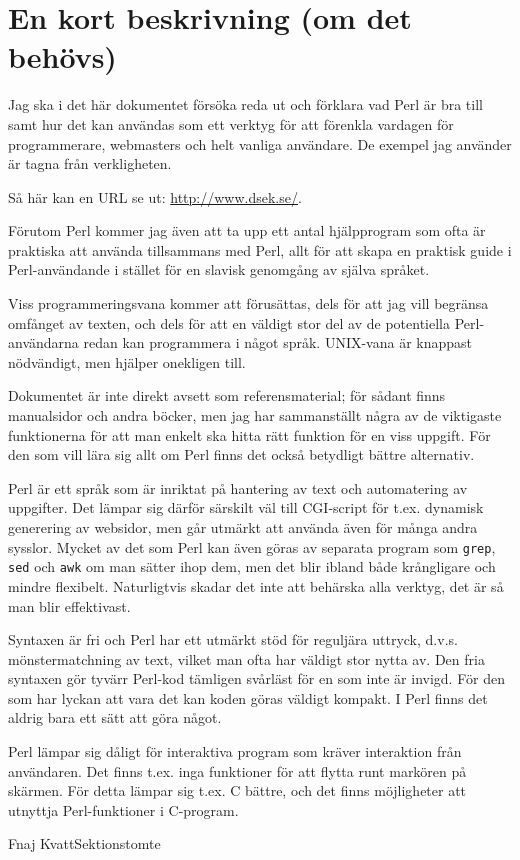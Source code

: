 \documentclass[11pt,twoside,a4paper]{article}
\begin{document}



\section*{En kort beskrivning (om det behövs)}

Jag ska i det här dokumentet försöka reda ut och förklara vad
Perl är bra till samt hur det kan användas som ett verktyg för
att förenkla vardagen för programmerare, webmasters och helt
vanliga användare. De exempel jag använder är tagna från
verkligheten.

Så här kan en URL se ut: \url{http://www.dsek.se/}.

Förutom Perl kommer jag även att ta upp ett antal hjälpprogram
som ofta är praktiska att använda tillsammans med Perl, allt för
att skapa en praktisk guide i Perl-användande i stället för en
slavisk genomgång av själva språket.

Viss programmeringsvana kommer att förusättas, dels för att jag
vill begränsa omfånget av texten, och dels för att en väldigt
stor del av de potentiella Perl-användarna redan kan programmera
i något språk. UNIX-vana är knappast nödvändigt, men hjälper
onekligen till.

Dokumentet är inte direkt avsett som referensmaterial; för sådant
finns manualsidor och andra böcker, men jag har sammanställt
några av de viktigaste funktionerna för att man enkelt ska hitta
rätt funktion för en viss uppgift. För den som vill lära sig allt
om Perl finns det också betydligt bättre alternativ.

Perl är ett språk som är inriktat på hantering av text och
automatering av uppgifter. Det lämpar sig därför särskilt väl
till CGI-script för t.ex. dynamisk generering av websidor, men
går utmärkt att använda även för många andra sysslor. Mycket av
det som Perl kan även göras av separata program som
\texttt{grep}, \texttt{sed} och \texttt{awk} om man sätter ihop
dem, men det blir ibland både krångligare och mindre flexibelt.
Naturligtvis skadar det inte att behärska alla verktyg, det är så
man blir effektivast.

Syntaxen är fri och Perl har ett utmärkt stöd för reguljära
uttryck, d.v.s. mönstermatchning av text, vilket man ofta har
väldigt stor nytta av. Den fria syntaxen gör tyvärr Perl-kod
tämligen svårläst för en som inte är invigd. För den som har
lyckan att vara det kan koden göras väldigt kompakt. I Perl finns
det aldrig bara ett sätt att göra något.

Perl lämpar sig dåligt för interaktiva program som kräver
interaktion från användaren. Det finns t.ex. inga funktioner för
att flytta runt markören på skärmen. För detta lämpar sig t.ex. C
bättre, och det finns möjligheter att utnyttja Perl-funktioner i
C-program.

\signature{Med vänliga hälsningar,}{Fnaj Kvatt}{Sektionstomte}
\end{document}

